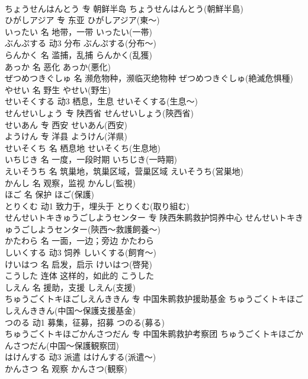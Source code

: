 \documentclass[8pt]{extreport}
\begin{document}
\begin{CJK}{UTF8}{min}
\\	ちょうせんはんとう	专	朝鲜半岛	ちょうせんはんとう(朝鮮半島)	
\\	ひがしアジア	专	东亚	ひがしアジア(東～)	
\\	いったい	名	地带，一带	いったい(一帯)	
\\	ぶんぷする	动3	分布	ぶんぷする(分布～)	
\\	らんかく	名	滥捕，乱捕	らんかく(乱獲)	
\\	あっか	名	恶化	あっか(悪化)	
\\	ぜつめつきぐしゅ	名	濒危物种，濒临灭绝物种	ぜつめつきぐしゅ(絶滅危惧種)	
\\	やせい	名	野生	やせい(野生)	
\\	せいそくする	动3	栖息，生息	せいそくする(生息～)	
\\	せんせいしょう	专	陕西省	せんせいしょう(陝西省)	
\\	せいあん	专	西安	せいあん(西安)	
\\	ようけん	专	洋县	ようけん(洋県)	
\\	せいそくち	名	栖息地	せいそくち(生息地)	
\\	いちじき	名	一度，一段时期	いちじき(一時期)	
\\	えいそうち	名	筑巢地，筑巢区域，营巢区域	えいそうち(営巣地)	
\\	かんし	名	观察，监视	かんし(監視)	
\\	ほご	名	保护	ほご(保護)	
\\	とりくむ	动1	致力于，埋头于	とりくむ(取り組む)	
\\	せんせいトキきゅうごしようセンター	专	陕西朱鹮救护饲养中心	せんせいトキきゅうごしようセンター(陝西～救護飼養～)	
\\	かたわら	名	一面，一边；旁边	かたわら	
\\	しいくする	动3	饲养	しいくする(飼育～)	
\\	けいはつ	名	启发，启示	けいはつ(啓発)	
\\	こうした	连体	这样的，如此的	こうした	
\\	しえん	名	援助，支援	しえん(支援)	
\\	ちゅうごくトキほごしえんききん	专	中国朱鹮救护援助基金	ちゅうごくトキほごしえんききん(中国～保護支援基金)	
\\	つのる	动1	募集，征募，招募	つのる(募る)	
\\	ちゅうごくトキほごかんさつだん	专	中国朱鹮救护考察团	ちゅうごくトキほごかんさつだん(中国～保護観察団)	
\\	はけんする	动3	派遣	はけんする(派遣～)	
\\	かんさつ	名	观察	かんさつ(観察)	

\end{CJK}
\end{document}

